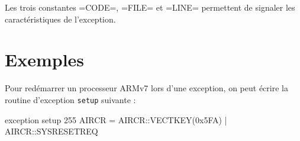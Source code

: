 Les trois constantes \plm=CODE=, \plm=FILE= et \plm=LINE= permettent de signaler les caractéristiques de l'exception.


\section{Exemples}

Pour redémarrer un processeur ARMv7 lors d'une exception, on peut écrire la routine d'exception \texttt{setup} suivante :
\begin{PLM}
exception setup 255 {
  AIRCR = AIRCR::VECTKEY(0x5FA) | AIRCR::SYSRESETREQ
}
\end{PLM}
